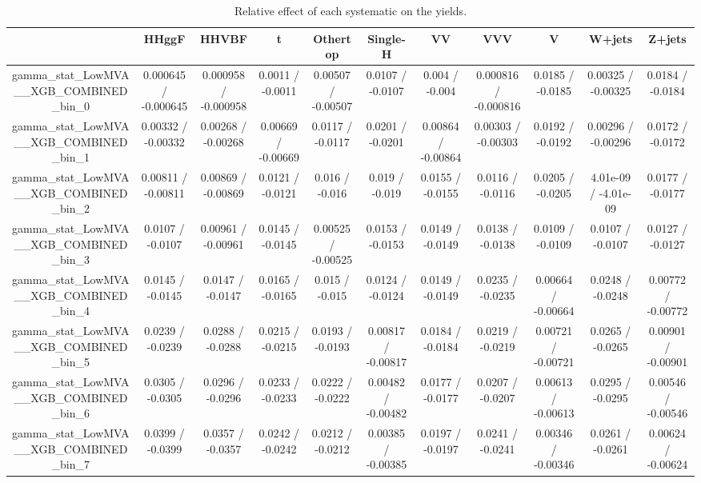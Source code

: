 \documentclass[10pt]{article}
\begin{document}
\begin{table}[htbp]
\begin{center}
\begin{tabular}{|c|c|c|c|c|c|c|c|c|c|c|}
\hline 
      & HHggF      & HHVBF      & t      & Othertop      & Single-H      & VV      & VVV      & V      & W+jets      & Z+jets \\ 
\hline 
  gamma_stat_LowMVA__XGB_COMBINED_bin_0 & 0.000645 / -0.000645 & 0.000958 / -0.000958 & 0.0011 / -0.0011 & 0.00507 / -0.00507 & 0.0107 / -0.0107 & 0.004 / -0.004 & 0.000816 / -0.000816 & 0.0185 / -0.0185 & 0.00325 / -0.00325 & 0.0184 / -0.0184 \\ 
  gamma_stat_LowMVA__XGB_COMBINED_bin_1 & 0.00332 / -0.00332 & 0.00268 / -0.00268 & 0.00669 / -0.00669 & 0.0117 / -0.0117 & 0.0201 / -0.0201 & 0.00864 / -0.00864 & 0.00303 / -0.00303 & 0.0192 / -0.0192 & 0.00296 / -0.00296 & 0.0172 / -0.0172 \\ 
  gamma_stat_LowMVA__XGB_COMBINED_bin_2 & 0.00811 / -0.00811 & 0.00869 / -0.00869 & 0.0121 / -0.0121 & 0.016 / -0.016 & 0.019 / -0.019 & 0.0155 / -0.0155 & 0.0116 / -0.0116 & 0.0205 / -0.0205 & 4.01e-09 / -4.01e-09 & 0.0177 / -0.0177 \\ 
  gamma_stat_LowMVA__XGB_COMBINED_bin_3 & 0.0107 / -0.0107 & 0.00961 / -0.00961 & 0.0145 / -0.0145 & 0.00525 / -0.00525 & 0.0153 / -0.0153 & 0.0149 / -0.0149 & 0.0138 / -0.0138 & 0.0109 / -0.0109 & 0.0107 / -0.0107 & 0.0127 / -0.0127 \\ 
  gamma_stat_LowMVA__XGB_COMBINED_bin_4 & 0.0145 / -0.0145 & 0.0147 / -0.0147 & 0.0165 / -0.0165 & 0.015 / -0.015 & 0.0124 / -0.0124 & 0.0149 / -0.0149 & 0.0235 / -0.0235 & 0.00664 / -0.00664 & 0.0248 / -0.0248 & 0.00772 / -0.00772 \\ 
  gamma_stat_LowMVA__XGB_COMBINED_bin_5 & 0.0239 / -0.0239 & 0.0288 / -0.0288 & 0.0215 / -0.0215 & 0.0193 / -0.0193 & 0.00817 / -0.00817 & 0.0184 / -0.0184 & 0.0219 / -0.0219 & 0.00721 / -0.00721 & 0.0265 / -0.0265 & 0.00901 / -0.00901 \\ 
  gamma_stat_LowMVA__XGB_COMBINED_bin_6 & 0.0305 / -0.0305 & 0.0296 / -0.0296 & 0.0233 / -0.0233 & 0.0222 / -0.0222 & 0.00482 / -0.00482 & 0.0177 / -0.0177 & 0.0207 / -0.0207 & 0.00613 / -0.00613 & 0.0295 / -0.0295 & 0.00546 / -0.00546 \\ 
  gamma_stat_LowMVA__XGB_COMBINED_bin_7 & 0.0399 / -0.0399 & 0.0357 / -0.0357 & 0.0242 / -0.0242 & 0.0212 / -0.0212 & 0.00385 / -0.00385 & 0.0197 / -0.0197 & 0.0241 / -0.0241 & 0.00346 / -0.00346 & 0.0261 / -0.0261 & 0.00624 / -0.00624 \\ 
\hline 
\end{tabular} 
\caption{Relative effect of each systematic on the yields.} 
\end{center} 
\end{table} 
\end{document}
